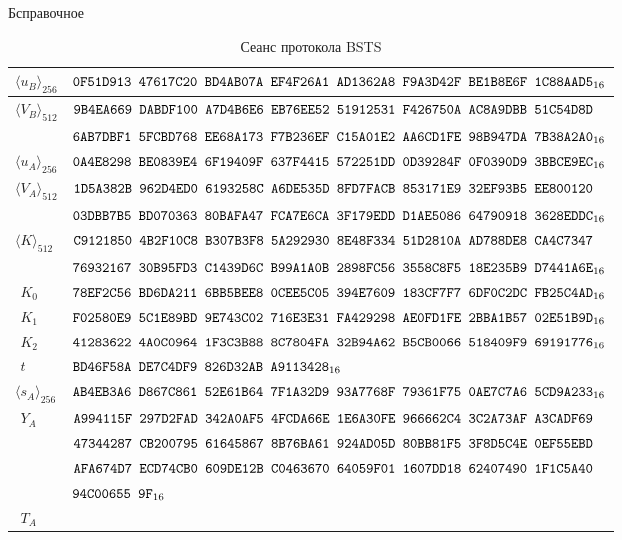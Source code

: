 \begin{appendix}{Б}{справочное}
\begin{table}[H]
\caption{Сеанс протокола BSTS}\label{Table.TEST.STS}
{\small
\begin{tabular}{|l|l|}
\hline
$\langle u_B\rangle_{256}$ & 
$\texttt{0F51D913~47617C20~BD4AB07A~EF4F26A1~AD1362A8~F9A3D42F~BE1B8E6F~1C88AAD5}_{16}$\\
%
\hline
$\langle V_B\rangle_{512}$ & 
$\texttt{9B4EA669~DABDF100~A7D4B6E6~EB76EE52~51912531~F426750A~AC8A9DBB~51C54D8D}$\\
&
$\texttt{6AB7DBF1~5FCBD768~EE68A173~F7B236EF~C15A01E2~AA6CD1FE~98B947DA~7B38A2A0}_{16}$\\
%
\hline
\hline
$\langle u_A\rangle_{256}$ & 
$\texttt{0A4E8298~BE0839E4~6F19409F~637F4415~572251DD~0D39284F~0F0390D9~3BBCE9EC}_{16}$\\
%
\hline
$\langle V_A\rangle_{512}$ & 
$\texttt{1D5A382B~962D4ED0~6193258C~A6DE535D~8FD7FACB~853171E9~32EF93B5~EE800120}$\\
&
$\texttt{03DBB7B5~BD070363~80BAFA47~FCA7E6CA~3F179EDD~D1AE5086~64790918~3628EDDC}_{16}$\\
%
\hline
$\langle K\rangle_{512}$ & 
$\texttt{C9121850~4B2F10C8~B307B3F8~5A292930~8E48F334~51D2810A~AD788DE8~CA4C7347}$\\
&
$\texttt{76932167~30B95FD3~C1439D6C~B99A1A0B~2898FC56~3558C8F5~18E235B9~D7441A6E}_{16}$\\
%
\hline
$\phantom{\langle}K_0$ & 
$\texttt{78EF2C56~BD6DA211~6BB5BEE8~0CEE5C05~394E7609~183CF7F7~6DF0C2DC~FB25C4AD}_{16}$\\
%
\hline
$\phantom{\langle}K_1$ & 
$\texttt{F02580E9~5C1E89BD~9E743C02~716E3E31~FA429298~AE0FD1FE~2BBA1B57~02E51B9D}_{16}$\\
%
\hline
$\phantom{\langle}K_2$ & 
$\texttt{41283622~4A0C0964~1F3C3B88~8C7804FA~32B94A62~B5CB0066~518409F9~69191776}_{16}$\\
%
\hline
$\phantom{\langle}t$ & 
$\texttt{BD46F58A~DE7C4DF9~826D32AB~A9113428}_{16}$\\
%
\hline
$\langle s_A\rangle_{256}$ & 
$\texttt{AB4EB3A6~D867C861~52E61B64~7F1A32D9~93A7768F~79361F75~0AE7C7A6~5CD9A233}_{16}$\\
%
\hline
$\phantom{\langle}Y_A$ & 
$\texttt{A994115F~297D2FAD~342A0AF5~4FCDA66E~1E6A30FE~966662C4~3C2A73AF~A3CADF69}$\\
&
$\texttt{47344287~CB200795~61645867~8B76BA61~924AD05D~80BB81F5~3F8D5C4E~0EF55EBD}$\\
&
$\texttt{AFA674D7~ECD74CB0~609DE12B~C0463670~64059F01~1607DD18~62407490~1F1C5A40}$\\
&
$\texttt{94C00655~9F}_{16}$\\
%
\hline
$\phantom{\langle}T_A$ & 

\end{tabular}}
\end{table}
\end{appendix}
